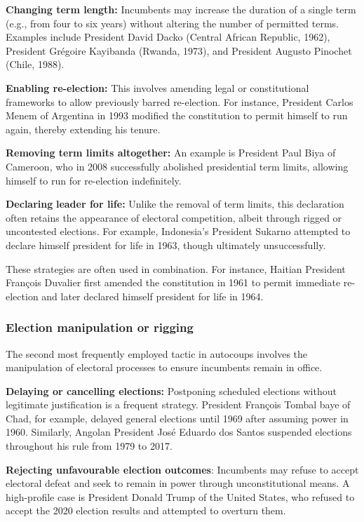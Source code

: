 \documentclass[
  12pt,
]{report}
\begin{document}
\textbf{Changing term length:} Incumbents may increase the duration of a
single term (e.g., from four to six years) without altering the number
of permitted terms. Examples include President David Dacko (Central
African Republic, 1962), President Grégoire Kayibanda (Rwanda, 1973),
and President Augusto Pinochet (Chile, 1988).

\textbf{Enabling re-election:} This involves amending legal or
constitutional frameworks to allow previously barred re-election. For
instance, President Carlos Menem of Argentina in 1993 modified the
constitution to permit himself to run again, thereby extending his
tenure.

\textbf{Removing term limits altogether:} An example is President Paul
Biya of Cameroon, who in 2008 successfully abolished presidential term
limits, allowing himself to run for re-election indefinitely.

\textbf{Declaring} \textbf{leader for life:} Unlike the removal of term
limits, this declaration often retains the appearance of electoral
competition, albeit through rigged or uncontested elections. For
example, Indonesia's President Sukarno attempted to declare himself
president for life in 1963, though ultimately unsuccessfully.

These strategies are often used in combination. For instance, Haitian
President François Duvalier first amended the constitution in 1961 to
permit immediate re-election and later declared himself president for
life in 1964.

\subsubsection*{Election manipulation or
rigging}\label{election-manipulation-or-rigging}

The second most frequently employed tactic in autocoups involves the
manipulation of electoral processes to ensure incumbents remain in
office.

\textbf{Delaying or cancelling elections:} Postponing scheduled
elections without legitimate justification is a frequent strategy.
President François Tombal baye of Chad, for example, delayed general
elections until 1969 after assuming power in 1960. Similarly, Angolan
President José Eduardo dos Santos suspended elections throughout his
rule from 1979 to 2017.

\textbf{Rejecting unfavourable election outcomes}: Incumbents may refuse
to accept electoral defeat and seek to remain in power through
unconstitutional means. A high-profile case is President Donald Trump of
the United States, who refused to accept the 2020 election results and
attempted to overturn them.
\end{document}
